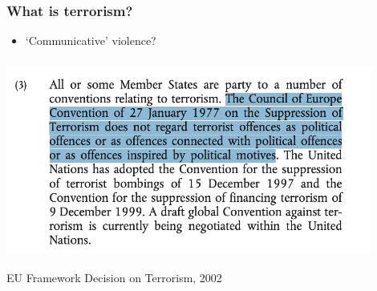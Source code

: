 \documentclass[aspectratio=43]{beamer}
\begin{document}
\begin{frame}
\frametitle{What is terrorism?}
\centering

\begin{itemize}
  \item `Communicative' violence?
\end{itemize}

\vspace{20pt}


\end{frame}



\begin{frame}
\frametitle{}
\centering

\includegraphics[width = 0.9\textwidth]{img/eu_law}

EU Framework Decision on Terrorism, 2002

\end{frame}
\end{document}
